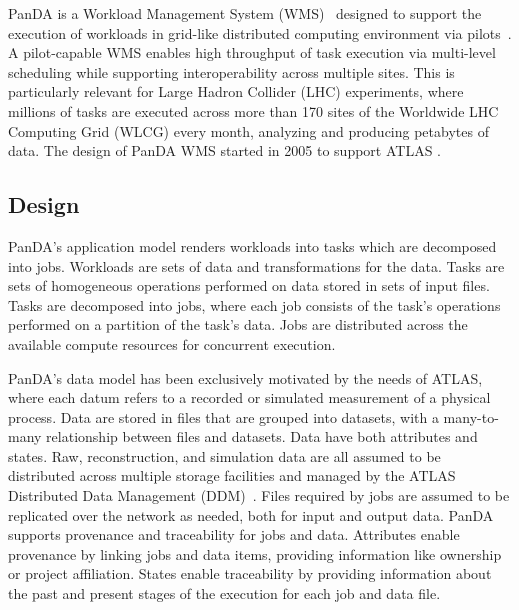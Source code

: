 PanDA is a Workload Management System (WMS)~\cite{marco2009glite} designed to
support the execution of workloads in grid-like distributed computing
environment via pilots~\cite{turilli2017comprehensive}. A pilot-capable WMS
enables high throughput of task execution via multi-level scheduling while
supporting interoperability across multiple sites. This is particularly
relevant for Large Hadron Collider (LHC) experiments, where millions of tasks
are executed across more than 170 sites of the Worldwide LHC Computing Grid
(WLCG) every month, analyzing and producing petabytes of data. The design of
PanDA WMS started in 2005 to support ATLAS \cite{?}.

\subsection{Design}
\label{subsec:design}

PanDA's application model renders workloads into tasks which are decomposed
into jobs. Workloads are sets of data and transformations for the data. Tasks
are sets of homogeneous operations performed on data stored in sets of input
files. Tasks are decomposed into jobs, where each job consists of the task's
operations performed on a partition of the task's data. Jobs are distributed
across the available compute resources for concurrent execution.

PanDA's data model has been exclusively motivated by the needs of ATLAS, where
each datum refers to a recorded or simulated measurement of a physical process.
Data are stored in files that are grouped into datasets, with a many-to-many
relationship between files and datasets. Data have both attributes and states.
Raw, reconstruction, and simulation data are all assumed to be distributed
across multiple storage facilities and managed by the ATLAS Distributed Data
Management (DDM)~\cite{garonne2012atlas}. Files required by jobs are assumed to
be replicated over the network as needed, both for input and output data. PanDA
supports provenance and traceability for jobs and data. Attributes enable
provenance by linking jobs and data items, providing information like ownership
or project affiliation. States enable traceability by providing information
about the past and present stages of the execution for each job and data file.


